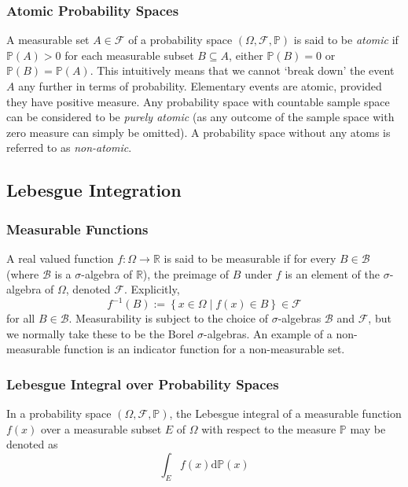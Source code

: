 \documentclass[11pt]{report} %
\begin{document}
\subsubsection{Atomic Probability Spaces}

A measurable set $A \in \mathcal{F}$ of a probability space $\left(\Omega, \mathcal{F}, \mathbb{P}\right)$ is said to be \textit{atomic} if $\mathbb{P}\left(A\right) > 0$ for each measurable subset $B \subseteq A$, either $\mathbb{P}\left(B\right) = 0$ or $\mathbb{P}\left(B\right) = \mathbb{P}\left(A\right)$. This intuitively means that we cannot `break down' the event $A$ any further in terms of probability. Elementary events are atomic, provided they have positive measure. Any probability space with countable sample space can be considered to be \textit{purely atomic} (as any outcome of the sample space with zero measure can simply be omitted). A probability space without any atoms is referred to as \textit{non-atomic}.

\subsection{Lebesgue Integration}

\subsubsection{Measurable Functions}

A real valued function $f: \Omega \to \mathbb{R}$ is said to be measurable if for every $B\in\mathcal{B}$ (where $\mathcal{B}$ is a $\sigma$-algebra of $\mathbb{R}$), the preimage of $B$ under $f$ is an element of the $\sigma$-algebra of $\Omega$, denoted $\mathcal{F}$. Explicitly,
\begin{equation}
f^{-1}\left(B\right) := \left\{x \in \Omega \middle| f\left(x\right) \in B\right\} \in \mathcal{F}
\end{equation}
for all $B \in\mathcal{B}$. Measurability is subject to the choice of $\sigma$-algebras $\mathcal{B}$ and $\mathcal{F}$, but we normally take these to be the Borel $\sigma$-algebras. An example of a non-measurable function is an indicator function for a non-measurable set.

\subsubsection{Lebesgue Integral over Probability Spaces}

In a probability space $\left(\Omega, \mathcal{F}, \mathbb{P}\right)$, the Lebesgue integral of a measurable function $f\left(x\right)$ over a measurable subset $E$ of $\Omega$ with respect to the measure $\mathbb{P}$ may be denoted as
\begin{equation}
\int_{E}f\left(x\right)\mathrm{d}\mathbb{P}\left(x\right)
\end{equation}
\end{document}
